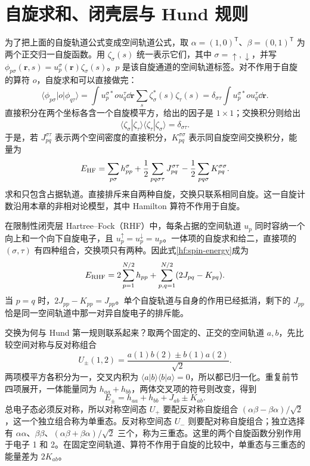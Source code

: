 \section{自旋求和、闭壳层与 Hund 规则}\label{hf:spin}
为了把上面的自旋轨道公式变成空间轨道公式，取
$\alpha=(1,0)^{\mathsf T}$、$\beta=(0,1)^{\mathsf T}$ 为两个正交归一自旋函数。用 $\zeta_\sigma(s)$ 统一表示它们，其中 $\sigma=\uparrow,\downarrow$，并写
$\phi_{p\sigma}(\bm r,s)=u_p^\sigma(\bm r)\zeta_\sigma(s)$。$p$ 是该自旋通道的空间轨道标签。对不作用于自旋的算符 $o$，自旋求和可以直接做完：
\begin{equation}
\langle\phi_{p\sigma}|o|\phi_{q\tau}\rangle
=\int u_p^{\sigma *}o u_q^\tau\dd\bm r
\sum_s\zeta_\sigma^*(s)\zeta_\tau(s)
=\delta_{\sigma\tau}\int u_p^{\sigma *}o u_q^\tau\dd\bm r.
\end{equation}
直接积分在两个坐标各含一个自旋模平方，给出的因子是 $1\times1$；交换积分则给出
\begin{equation}
\langle\zeta_\sigma|\zeta_\tau\rangle
\langle\zeta_\tau|\zeta_\sigma\rangle=\delta_{\sigma\tau}.
\end{equation}
于是，若 $J_{pq}^{\sigma\tau}$ 表示两个空间密度的直接积分，$K_{pq}^{\sigma\sigma}$ 表示同自旋空间交换积分，能量为
\begin{equation}\label{hf:spin-energy}
E_{\rm HF}=\sum_{p\sigma}h_{pp}^\sigma
+\frac12\sum_{pq\sigma\tau}J_{pq}^{\sigma\tau}
-\frac12\sum_{pq\sigma}K_{pq}^{\sigma\sigma}.
\end{equation}
求和只包含占据轨道。直接排斥来自两种自旋，交换只联系相同自旋。这一自旋计数沿用本章的非相对论模型，其中 Hamilton 算符不作用于自旋。

在限制性闭壳层 Hartree--Fock（RHF）中，每条占据的空间轨道 $u_p$ 同时容纳一个向上和一个向下自旋电子，且 $u_p^\uparrow=u_p^\downarrow=u_p$。一体项的自旋求和给二，直接项的 $(\sigma,\tau)$ 有四种组合，交换项只有两种。因此式\eqref{hf:spin-energy}成为
\begin{equation}\label{hf:closed-energy}
E_{\rm RHF}=2\sum_{p=1}^{N/2}h_{pp}
+\sum_{p,q=1}^{N/2}(2J_{pq}-K_{pq}).
\end{equation}
当 $p=q$ 时，$2J_{pp}-K_{pp}=J_{pp}$。单个自旋轨道与自身的作用已经抵消，剩下的 $J_{pp}$ 恰是同一空间轨道中那一对异自旋电子的排斥能。

交换为何与 Hund 第一规则联系起来？取两个固定的、正交的空间轨道 $a,b$，先比较空间对称与反对称组合
\begin{equation}
U_\pm(1,2)=\frac{a(1)b(2)\pm b(1)a(2)}{\sqrt2}.
\end{equation}
两项模平方各积分为一，交叉内积为 $\langle a|b\rangle\langle b|a\rangle=0$，所以都已归一化。重复前节四项展开，一体能量同为 $h_{aa}+h_{bb}$，两体交叉项的符号则改变，得到
\begin{equation}
E_\pm=h_{aa}+h_{bb}+J_{ab}\pm K_{ab}.
\end{equation}
总电子态必须反对称，所以对称空间态 $U_+$ 要配反对称自旋组合
$(\alpha\beta-\beta\alpha)/\sqrt2$，这一个独立组合称为单重态。反对称空间态 $U_-$ 则要配对称自旋组合；独立选择有 $\alpha\alpha$、$\beta\beta$、$(\alpha\beta+\beta\alpha)/\sqrt2$ 三个，称为三重态。这里的两个自旋函数分别作用于电子 1 和 2。在固定空间轨道、算符不作用于自旋的比较中，单重态与三重态的能量差为 $2K_{ab}$。

